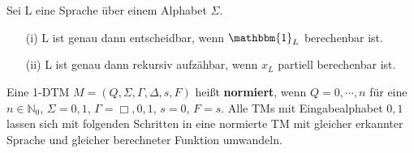  Sei L eine Sprache über einem Alphabet $\Sigma$. 
\begin{itemize}
  \item [(i)] L ist genau dann entscheidbar, wenn $\mathbbm{1}_L$ berechenbar ist.
  \item [(ii)] L ist genau dann rekursiv aufzähbar, wenn $x_L$ partiell berechenbar ist.
\end{itemize}

\newpage

 Eine 1-DTM $M = (Q, \Sigma, \Gamma, \Delta, s, F)$ heißt \textbf{normiert}, wenn $Q = {0,\cdots, n}$ für eine $n \in \mathbb{N}_{0}$, $\Sigma = {0, 1}$, $\Gamma = {\Box, 0, 1}$, $s = 0$, $F = {s}$. Alle TMs mit Eingabealphabet ${0,1}$ lassen sich mit folgenden Schritten in eine normierte TM mit gleicher erkannter Sprache und gleicher berechneter Funktion umwandeln. 
